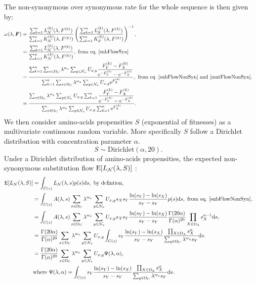 The non-synonymous over synonymous rate for the whole sequence is then given by:
\begin{align}
\omega(\lambda, \bm{F})
& =\dfrac{\sum_{k=1}^{n} L_{\NonSyn}^{(k)}(\lambda, F^{(k)})}{\sum_{k=1}^{n}K_{\NonSyn}^{(k)}(\lambda, F^{(k)})}  \left( \dfrac{\sum_{k=1}^{n}L_{\Syn}^{(k)}(\lambda, F^{(k)})}{\sum_{k=1}^{n}K_{\Syn}^{(k)}(\lambda, F^{(k)})}  \right)^{-1}, \\
& =\dfrac{\sum_{k=1}^{n} L_{\NonSyn}^{(k)}(\lambda, F^{(k)})}{\sum_{k=1}^{n}K_{\NonSyn}^{(k)}(\lambda, F^{(k)})}, \ \textrm{from eq.}\ \ref{subFlowSyn} \\
& =\dfrac{ \sum_{k=1}^{n} \sum_{x \in \SetCodon} \lambda^{w_x} \sum_{y \in \NxNonSyn}  U_{x, y} \dfrac{F_Y^{(k)} - F_X^{(k)}}{\e^{ - F_Y^{(k)}} -  \e^{- F_X^{(k)}} } }{ \sum_{k=1}^{n} \sum_{x \in \SetCodon}  \lambda^{w_x}  \sum_{y \in \NxNonSyn} U_{x, y} \e^{F_X^{(k)}}}, \ \textrm{from eq.}\ \ref{subFlowNonSyn} \ \text{and} \ \ref{mutFlowNonSyn}. \\
& =\dfrac{ \sum_{x \in \SetCodon} \lambda^{w_x} \sum_{y \in \NxNonSyn}  U_{x, y}  \sum_{k=1}^{n} \dfrac{F_Y^{(k)} - F_X^{(k)}}{\e^{ - F_Y^{(k)}} -  \e^{- F_X^{(k)}} } }{  \sum_{x \in \SetCodon}  \lambda^{w_x}  \sum_{y \in \NxNonSyn} U_{x, y}  \sum_{k=1}^{n} \e^{F_X^{(k)}}}.
\label{omegaSeq}
\end{align}
We then consider amino-acids propensities $S$ (exponential of fitnesses) as a multivariate continuous random variable. More specifically $S$ follow a Dirichlet distribution with concentration parameter $\alpha$.
\begin{equation}
S \sim \mathrm{Dirichlet}(\alpha, 20).
\end{equation}
Under a Dirichlet distribution of amino-acids propensities, the expected non-synonymous substitution flow $\operatorname{E} [L_{\mathcal{N}}(\lambda, S)]$ :
\begin{align}
\operatorname{E} [L_{\mathcal{N}}(\lambda, S)]
& =\int_{C(s)} L_{\mathcal{N}}(\lambda, s) p(s) \mathrm{d} s, \ \textrm{by defintion}, \\
& =\int_{C(s)} A(\lambda, s) \sum_{x \in \Omega_{\mathrm{C}}} \lambda^{w_x} \sum_{y \in \mathcal{N}_x} U_{x, y} s_X s_Y\dfrac{\ln(s_Y)-\ln(s_X)}{s_Y - s_Y} p(s) \mathrm{d} s , \ \textrm{from eq.}\ \ref{subFlowNonSyn}, \\
& =\int_{C(s)} A(\lambda, s) \sum_{x \in \Omega_{\mathrm{C}}} \lambda^{w_x} \sum_{y \in \mathcal{N}_x} U_{x, y} s_X s_Y\dfrac{\ln(s_Y)-\ln(s_X)}{s_Y - s_Y} {\frac {\Gamma (20 \alpha)}{\Gamma (\alpha )^{20}}} \prod_{X \in \Omega_{\mathrm{A}}} s_X^{\alpha-1} \mathrm{d} s,\\
& ={\frac {\Gamma (20 \alpha)}{\Gamma (\alpha )^{20}}} \sum_{x \in \Omega_{\mathrm{C}}} \lambda^{w_x} \sum_{y \in \mathcal{N}_x} U_{x, y} \int_{C(s)} s_Y\dfrac{\ln(s_Y)-\ln(s_X)}{s_Y - s_Y} \dfrac{\prod_{X \in \Omega_{\mathrm{A}}} s_X^{\alpha}}{\sum_{y \in \Omega_{\mathrm{C}}} \lambda^{w_y} s_Y} \mathrm{d} s.\\
& ={\frac {\Gamma (20 \alpha)}{\Gamma (\alpha )^{20}}} \sum_{x \in \Omega_{\mathrm{C}}} \lambda^{w_x} \sum_{y \in \mathcal{N}_x} U_{x, y} \Psi(\lambda, \alpha), \\
& \textrm{where} \ \Psi(\lambda, \alpha) = \int_{C(s)} s_Y\dfrac{\ln(s_Y)-\ln(s_X)}{s_Y - s_Y} \dfrac{\prod_{X \in \Omega_{\mathrm{A}}} s_X^{\alpha}}{\sum_{y \in \Omega_{\mathrm{C}}} \lambda^{w_y} s_Y} \mathrm{d} s.
\end{align}
